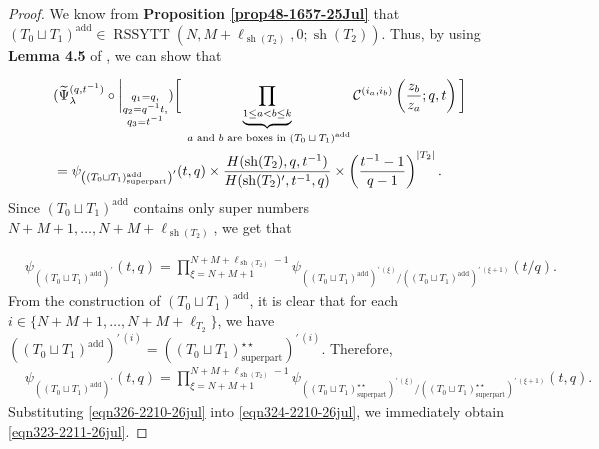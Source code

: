 \documentclass[12pt,reqno,a4paper]{amsart}
\newcommand{\comp}{\circ}
\newcommand{\cals}[1]{\mathcal{#1}}
\numberwithin{equation}{section}
\theoremstyle{definition}
\begin{document}
\begin{proof}
We know from \textbf{Proposition \ref{prop48-1657-25Jul}} that $(T_0 \sqcup T_1)^{\operatorname{add}} \in \operatorname{RSSYTT}(N,M+\ell_{\operatorname{sh}(T_2)},0;\operatorname{sh}(T_2))$. Thus, by using \textbf{Lemma 4.5} of \cite{CSW2025}, we can show that 

\footnotesize
\begin{align}
	&(
	\widetilde{\Psi}_{\lambda}^{(q,t^{-1})}
	\comp 
	\bigg|_{
		\substack{
			q_1 = q, \\
			q_2 = q^{-1}t,\\
			q_3 = t^{-1} \\
		}
	}
	)
	\bigg[
	\underbrace{	\prod_{1 \leq a < b \leq k}				}_{\text{ $a$ and $b$ are boxes in $(T_0 \sqcup T_1)^{\operatorname{add}}$}}
	\cals{C}^{(i_a,i_b)}\left(
	\frac{z_b}{z_a}
	; q, t
	\right)
	\bigg]
	\label{eqn324-2210-26jul}
	\\
	&= 
	\psi_{ 	\left(	(T_0 \sqcup T_1)^{\operatorname{add}}_{\operatorname{super part}}			\right)^\prime				}(t,q)
	\times 
	\frac{
		H(\operatorname{sh}(T_2),q,t^{-1})
	}{
		H(\operatorname{sh}(T_2)^\prime,t^{-1},q)
	}
	\times 
	\left(		\frac{t^{-1} - 1}{q - 1}			\right)^{|T_2|}. 
	\notag 
\end{align}
\normalsize
Since $(T_0 \sqcup T_1)^{\operatorname{add}}$ contains only super numbers $N+M+1,\dots,N+M+\ell_{\operatorname{sh}(T_2)}$, we get that 

\begin{align}
	&\psi_{ 	\left(	(T_0 \sqcup T_1)^{\operatorname{add}}			\right)^\prime				}(t,q)
	= 
	\prod_{\xi = N + M + 1}^{N + M + \ell_{\operatorname{sh}(T_2)} - 1}
	\psi_{\left(	(T_0 \sqcup T_1)^{\operatorname{add}}			\right)^{\prime \, (\xi)}/\left(	(T_0 \sqcup T_1)^{\operatorname{add}}			\right)^{\prime \, (\xi + 1)}	}(t/q). 
\end{align}
From the construction of $(T_0 \sqcup T_1)^{\operatorname{add}}$, it is clear that for each 
$i \in \{N+M+1,\dots,N+M+\ell_{T_2}\}$, we have $\left((T_0 \sqcup T_1)^{\operatorname{add}}			\right)^{\prime \, (i)} = 
\left(	(T_0 \sqcup T_1)^{\star\star}_{\operatorname{super part}}			\right)^{\prime \, (i)}.$
Therefore, 
\begin{align}
	&\psi_{ 	\left(	(T_0 \sqcup T_1)^{\operatorname{add}}			\right)^\prime				}(t,q)
	= 
	\prod_{\xi = N + M + 1}^{N + M + \ell_{\operatorname{sh}(T_2)} - 1}
	\psi_{\left(	(T_0 \sqcup T_1)^{\star\star}_{\operatorname{super part}}			\right)^{\prime \, (\xi)}/\left(	(T_0 \sqcup T_1)^{\star\star}_{\operatorname{super part}}			\right)^{\prime \, (\xi + 1)}}(t,q). 
\label{eqn326-2210-26jul}
\end{align}
Substituting \eqref{eqn326-2210-26jul} into \eqref{eqn324-2210-26jul}, we immediately obtain \eqref{eqn323-2211-26jul}. 
\end{proof}
\end{document}
